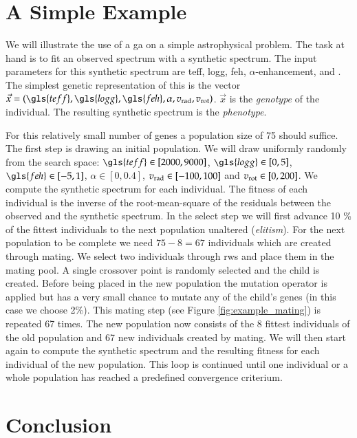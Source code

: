 \section{A Simple Example}
We will illustrate the use of a \gls{ga} on a simple astrophysical problem. The task at hand is to fit an observed spectrum with a synthetic spectrum. The input parameters for this synthetic spectrum are \gls{teff}, \gls{logg}, \gls{feh}, $\alpha$-enhancement, \vrad and \vrot. The simplest genetic representation of this is the vector $\vec{x} = (\gls{teff}, \gls{logg}, \gls{feh}, \alpha, \vrad, \vrot)$. $\vec{x}$ is the \textit{genotype} of the individual. The resulting synthetic spectrum is the \textit{phenotype}. 

For this relatively small number of genes a population size of 75 should suffice. The first step is drawing an initial population. We will draw uniformly randomly from the search space: $\gls{teff} \in [2000, 9000]$, $\gls{logg} \in [0, 5]$, $\gls{feh} \in [-5,1]$, $\alpha \in [0,0.4]$, $\hbox{$v_{\textrm{rad}}$} \in [-100, 100]$ and $\hbox{$v_{\textrm{rot}}$} \in [0,200]$. We compute the synthetic spectrum for each individual. The fitness of each individual is the inverse of the root-mean-square of the residuals between the observed and the synthetic spectrum. 
In the select step we will first advance 10 \% of the fittest individuals to the next population unaltered (\textit{elitism}). For the next population to be complete we need $75 - 8 = 67$ individuals which are created through mating. We select two individuals through \gls{rws} and place them in the mating pool. A single crossover point is randomly selected and the child is created. Before being placed in the new population the mutation operator is applied but has a very small chance to mutate any of the child's genes (in this case we choose 2\%).
This mating step (see Figure \ref{fig:example_mating}) is repeated 67 times. The new population now consists of the 8 fittest individuals of the old population and 67 new individuals created by mating. We will then start again to compute the synthetic spectrum and the resulting fitness for each individual of the new population. This loop is continued until one individual or a whole population has reached a predefined convergence criterium.

\section{Conclusion}


